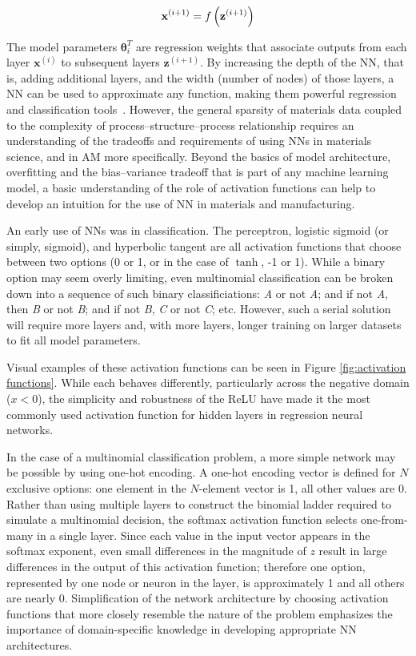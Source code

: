\begin{equation}
	{\bold x}^{(i+1)} = f \left( {\bold z}^{(i+1)} \right)
\end{equation}

The model parameters $\mathbf{\theta}_i^T$ are regression weights that associate outputs from each layer $\mathbf{x}^{(i)}$ to subsequent layers $\mathbf{z}^{(i + 1)}$. By increasing the depth of the NN, that is, adding additional layers, and the width (number of nodes) of those layers, a NN can be used to approximate any function, making them powerful regression and classification tools~\cite{Hornik1989}. However, the general sparsity of materials data coupled to the complexity of process--structure--process relationship requires an understanding of the tradeoffs and requirements of using NNs in materials science, and in AM more specifically. Beyond the basics of model architecture, overfitting and the bias--variance tradeoff that is part of any machine learning model, a basic understanding of the role of activation functions can help to develop an intuition for the use of NN in materials and manufacturing.

An early use of NNs was in classification. The perceptron, logistic sigmoid (or simply, sigmoid), and hyperbolic tangent are all activation functions that choose between two options (0 or 1, or in the case of $\tanh$, -1 or 1). While a binary option may seem overly limiting, even multinomial classification can be broken down into a sequence of such binary classificiations: \textit{A} or not \textit{A}; and if not \textit{A}, then \textit{B} or not \textit{B}; and if not \textit{B}, \textit{C} or not \textit{C}; etc. However, such a serial solution will require more layers and, with more layers, longer training on larger datasets to fit all model parameters.

Visual examples of these activation functions can be seen in Figure \ref{fig:activation functions}. While each behaves differently, particularly across the negative domain ($x < 0$), the simplicity and robustness of the ReLU have made it the most commonly used activation function for hidden layers in regression neural networks.

In the case of a multinomial classification problem, a more simple network may be possible by using one-hot encoding. A one-hot encoding vector is defined for $N$ exclusive options: one element in the $N$-element vector is 1, all other values are 0. Rather than using multiple layers to construct the binomial ladder required to simulate a multinomial decision, the softmax activation function selects one-from-many in a single layer. Since each value in the input vector appears in the softmax exponent, even small differences in the magnitude of $z$ result in large differences in the output of this activation function; therefore one option, represented by one node or neuron in the layer, is approximately 1 and all others are nearly 0. Simplification of the network architecture by choosing activation functions that more closely resemble the nature of the problem emphasizes the importance of domain-specific knowledge in developing appropriate NN architectures.

